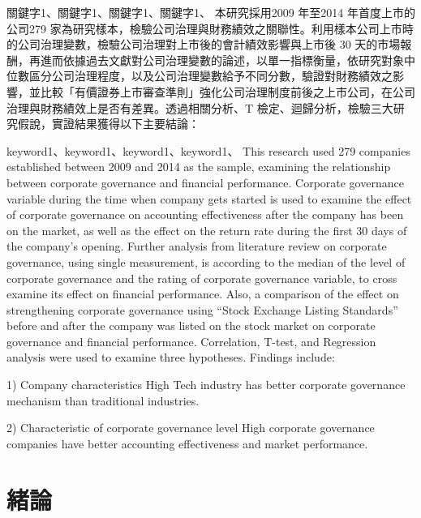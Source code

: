 \documentclass[
    writingLanguage=chinese,
    addPageTitle=yes,
    AddDeclaration=yes,
    addMUSTlog=no,
    refUnindent=yes,
    printing=no,
]{.def/must}
\begin{document}
\begin{abstract@cn}{關鍵字1、關鍵字1、關鍵字1、關鍵字1、}
本研究採用2009 年至2014 年首度上市的公司279 家為研究樣本，檢驗公司治理與財務績效之關聯性。利用樣本公司上市時的公司治理變數，檢驗公司治理對上市後的會計績效影響與上市後 30 天的市場報酬，再進而依據過去文獻對公司治理變數的論述，以單一指標衡量，依研究對象中位數區分公司治理程度，以及公司治理變數給予不同分數，驗證對財務績效之影響，並比較「有價證券上市審查準則」強化公司治理制度前後之上市公司，在公司治理與財務績效上是否有差異。透過相關分析、T 檢定、迴歸分析，檢驗三大研究假說，實證結果獲得以下主要結論： 
\the\baselineskip
\end{abstract@cn}

\begin{abstract@en}{keyword1、keyword1、keyword1、keyword1、}
This research used 279 companies established between 2009 and 2014 as the
sample, examining the relationship between corporate governance and financial
performance. Corporate governance variable during the time when company
gets started is used to examine the effect of corporate governance on accounting
effectiveness after the company has been on the market, as well as the effect on
the return rate during the first 30 days of the company’s opening. Further
analysis from literature review on corporate governance, using single
measurement, is according to the median of the level of corporate governance
and the rating of corporate governance variable, to cross examine its effect on
financial performance. Also, a comparison of the effect on strengthening
corporate governance using “Stock Exchange Listing Standards” before and
after the company was listed on the stock market on corporate governance and
financial performance. Correlation, T-test, and Regression analysis were used to
examine three hypotheses. Findings include:

1) Company characteristics
High Tech industry has better corporate governance mechanism than traditional
industries.

2) Characteristic of corporate governance level
High corporate governance companies have better accounting effectiveness and
market performance.
\end{abstract@en}

\addtableofcontents

\chapter{緒論}
\end{document}
